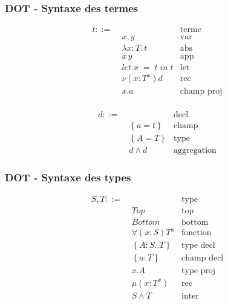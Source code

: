 \documentclass{beamer}
\newcommand{\lambdaExpr}[2]{\lambda #1 . \, #2}
\newcommand{\localLetBinding}[3]{let \; #1 \; = \; #2 \; in \; #3}
\begin{document}
\begin{frame}
  \frametitle{DOT - Syntaxe des termes}
  \begin{minipage}{0.45\textwidth}
    \begin{align*}
      t ::= & \, & \text{terme} \\
            & \; x, y & \text{var} \\
            & \; \lambdaExpr{x : T}{t} & \text{abs} \\
            & \; x \, y & \text{app} \\
            & \; \localLetBinding{x}{t}{t} & \text{let} \\
            & \; \nu(x : T^{x})d & \text{rec} \\
            & \; x.a & \text{champ proj} \\
    \end{align*}
  \end{minipage}
  \begin{minipage}{0.45\textwidth}
    \begin{align*}
      d ::= & \, & \text{decl} \\
            & \; \left\{ a = t \right\} & \text{champ} \\
            & \; \left\{ A = T \right\} & \text{type} \\
            & \; d \wedge d & \text{aggregation}
    \end{align*}
  \end{minipage}
\end{frame} 

\begin{frame}
  \frametitle{DOT - Syntaxe des types}
  \begin{align*}
    S, T ::= & \, & \text{type} \\
             & \; Top & \text{top} \\
             & \; Bottom & \text{bottom} \\
             & \; \forall(x : S) T^{x} & \text{fonction} \\
             & \; \left\{ A : S .. T \right\} & \text{type decl} \\
             & \; \left\{ a : T \right\} & \text{champ decl} \\
             & \; x.A & \text{type proj} \\
             & \; \mu(x : T^{x}) & \text{rec} \\
             & \; S \wedge T & \text{inter}
  \end{align*}
\end{frame} 
\end{document}
